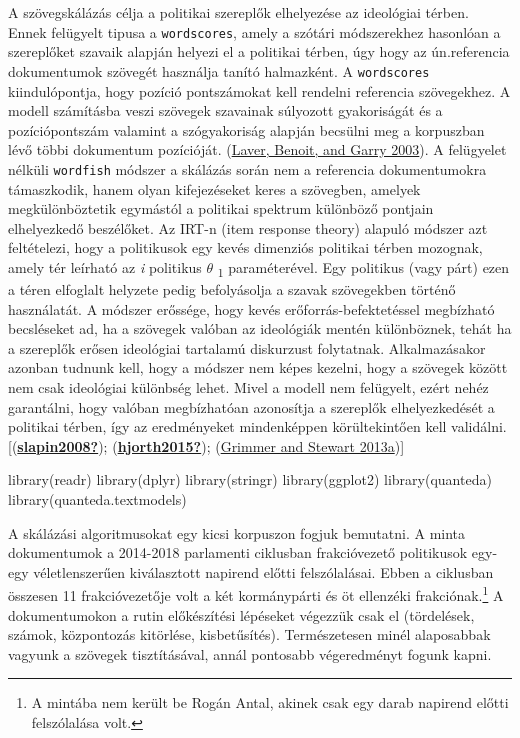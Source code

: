 \documentclass[
]{book}
\newenvironment{Shaded}{\begin{snugshade}}{\end{snugshade}}
\newcommand{\FunctionTok}[1]{\textcolor[rgb]{0.00,0.00,0.00}{#1}}
\newcommand{\NormalTok}[1]{#1}
\begin{document}
A szövegskálázás célja a politikai szereplők elhelyezése az ideológiai
térben. Ennek felügyelt tipusa a \texttt{wordscores}, amely a szótári
módszerekhez hasonlóan a szereplőket szavaik alapján helyezi el a
politikai térben, úgy hogy az ún.referencia dokumentumok szövegét
használja tanító halmazként. A \texttt{wordscores} kiindulópontja, hogy
pozíció pontszámokat kell rendelni referencia szövegekhez. A modell
számításba veszi szövegek szavainak súlyozott gyakoriságát és a
pozíciópontszám valamint a szógyakoriság alapján becsülni meg a
korpuszban lévő többi dokumentum pozícióját.
(\protect\hyperlink{ref-laver2003extracting}{Laver, Benoit, and Garry
2003}). A felügyelet nélküli \texttt{wordfish} módszer a skálázás során
nem a referencia dokumentumokra támaszkodik, hanem olyan kifejezéseket
keres a szövegben, amelyek megkülönböztetik egymástól a politikai
spektrum különböző pontjain elhelyezkedő beszélőket. Az IRT-n (item
response theory) alapuló módszer azt feltételezi, hogy a politikusok egy
kevés dimenziós politikai térben mozognak, amely tér leírható az
\emph{i} politikus \(\theta\) \textsubscript{1} paraméterével. Egy
politikus (vagy párt) ezen a téren elfoglalt helyzete pedig befolyásolja
a szavak szövegekben történő használatát. A módszer erőssége, hogy kevés
erőforrás-befektetéssel megbízható becsléseket ad, ha a szövegek valóban
az ideológiák mentén különböznek, tehát ha a szereplők erősen ideológiai
tartalamú diskurzust folytatnak. Alkalmazásakor azonban tudnunk kell,
hogy a módszer nem képes kezelni, hogy a szövegek között nem csak
ideológiai különbség lehet. Mivel a modell nem felügyelt, ezért nehéz
garantálni, hogy valóban megbízhatóan azonosítja a szereplők
elhelyezkedését a politikai térben, így az eredményeket mindenképpen
körültekintően kell validálni.
{[}(\protect\hyperlink{ref-slapin2008}{\textbf{slapin2008?}});
(\protect\hyperlink{ref-hjorth2015}{\textbf{hjorth2015?}});
(\protect\hyperlink{ref-grimmer2013text}{Grimmer and Stewart 2013a}){]}

\begin{Shaded}
\begin{Highlighting}[]
\FunctionTok{library}\NormalTok{(readr)}
\FunctionTok{library}\NormalTok{(dplyr)}
\FunctionTok{library}\NormalTok{(stringr)}
\FunctionTok{library}\NormalTok{(ggplot2)}
\FunctionTok{library}\NormalTok{(quanteda)}
\FunctionTok{library}\NormalTok{(quanteda.textmodels)}
\end{Highlighting}
\end{Shaded}

A skálázási algoritmusokat egy kicsi korpuszon fogjuk bemutatni. A minta
dokumentumok a 2014-2018 parlamenti ciklusban frakcióvezető politikusok
egy-egy véletlenszerűen kiválasztott napirend előtti felszólalásai.
Ebben a ciklusban összesen 11 frakcióvezetője volt a két kormánypárti és
öt ellenzéki frakciónak.\footnote{A mintába nem került be Rogán Antal,
  akinek csak egy darab napirend előtti felszólalása volt.} A
dokumentumokon a rutin előkészítési lépéseket végezzük csak el
(tördelések, számok, központozás kitörlése, kisbetűsítés). Természetesen
minél alaposabbak vagyunk a szövegek tisztításával, annál pontosabb
végeredményt fogunk kapni.
\end{document}
